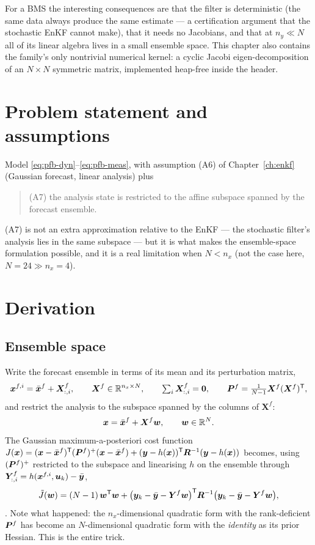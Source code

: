 For a BMS the interesting consequences are that the filter is deterministic (the same data always
produce the same estimate --- a certification argument that the stochastic EnKF cannot make), that
it needs no Jacobians, and that at $n_y \ll N$ all of its linear algebra lives in a small ensemble
space.  This chapter also contains the family's only nontrivial numerical kernel: a cyclic Jacobi
eigen-decomposition of an $N\times N$ symmetric matrix, implemented heap-free inside the header.

\section{Problem statement and assumptions}
Model \eqref{eq:pfb-dyn}--\eqref{eq:pfb-meas}, with assumption (A6) of Chapter~\ref{ch:enkf}
(Gaussian forecast, linear analysis) plus
\begin{quote}
(A7) the analysis state is restricted to the affine subspace spanned by the forecast ensemble.
\end{quote}
(A7) is not an extra approximation relative to the EnKF --- the stochastic filter's analysis lies in
the same subspace --- but it is what makes the ensemble-space formulation possible, and it is a real
limitation when $N < n_x$ (not the case here, $N = 24 \gg n_x = 4$).

\section{Derivation}

\subsection{Ensemble space}
Write the forecast ensemble in terms of its mean and its perturbation matrix,
\begin{equation}
  \bm{x}^{f,i} = \bar{\bm{x}}^f + \bm{X}^f_{:,i}, \qquad
  \bm{X}^f \in \mathbb{R}^{n_x\times N}, \qquad \textstyle\sum_i \bm{X}^f_{:,i} = \bm 0,
  \qquad \bm{P}^f = \frac{1}{N-1}\bm{X}^f(\bm{X}^f)^{\mathsf{T}},
  \label{eq:etkf-Xf}
\end{equation}
and restrict the analysis to the subspace spanned by the columns of $\bm{X}^f$:
\begin{equation}
  \bm{x} = \bar{\bm{x}}^f + \bm{X}^f\bm{w}, \qquad \bm w\in\mathbb{R}^N .
  \label{eq:etkf-subspace}
\end{equation}
The Gaussian maximum-a-posteriori cost function
$J(\bm{x}) = (\bm{x}-\bar{\bm{x}}^f)^{\mathsf{T}}(\bm{P}^f)^{+}(\bm{x}-\bar{\bm{x}}^f) + (\bm{y}-h(\bm{x}))^{\mathsf{T}}\bm{R}^{-1}(\bm{y}-h(\bm{x}))$
becomes, using $(\bm{P}^f)^{+}$ restricted to the subspace and linearising $h$ on the ensemble through
$\bm{Y}^f_{:,i} = h(\bm{x}^{f,i},\bm{u}_k) - \bar{\bm{y}}$,
\begin{equation}
  \tilde J(\bm w) = (N-1)\,\bm w^{\mathsf{T}}\bm w
    + \big(\bm{y}_k - \bar{\bm{y}} - \bm{Y}^f\bm w\big)^{\mathsf{T}}\bm{R}^{-1}\big(\bm{y}_k-\bar{\bm{y}}-\bm{Y}^f\bm w\big),
  \label{eq:etkf-cost}
\end{equation}
\cite[\S2.3]{hunt2007letkf}.  Note what happened: the $n_x$-dimensional quadratic form with the
rank-deficient $\bm{P}^f$ has become an $N$-dimensional quadratic form with the \emph{identity} as its
prior Hessian.  This is the entire trick.

